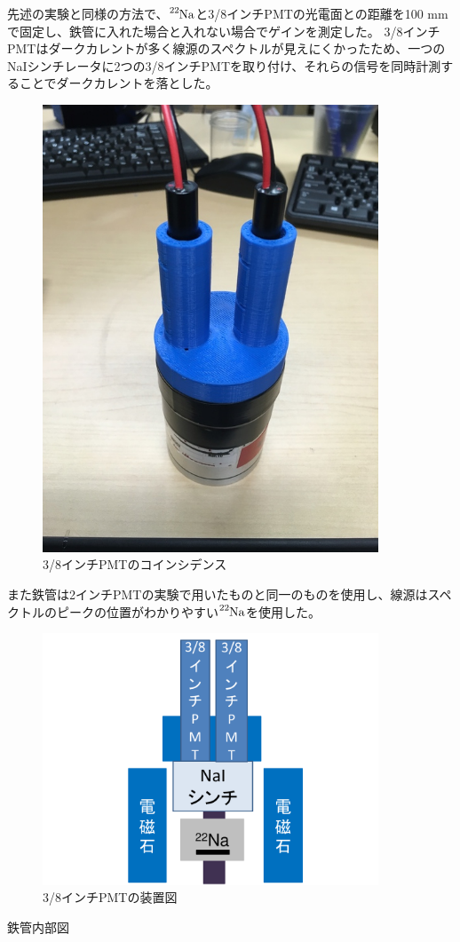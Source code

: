 先述の実験と同様の方法で、$\ce{^{22}Na}$と3/8インチPMTの光電面との距離を100 mmで固定し、鉄管に入れた場合と入れない場合でゲインを測定した。
3/8インチPMTはダークカレントが多く線源のスペクトルが見えにくかったため、一つのNaIシンチレータに2つの3/8インチPMTを取り付け、それらの信号を同時計測することでダークカレントを落とした。
\begin{figure}[H]
	\centering
		\includegraphics[width=10cm]{fig/iguchi/PPMT.jpg}
	\caption{3/8インチPMTのコインシデンス}
	\label{3/8inchcoin}
\end{figure}

また鉄管は2インチPMTの実験で用いたものと同一のものを使用し、線源はスペクトルのピークの位置がわかりやすい$\ce{^{22}Na}$を使用した。
\begin{figure}[H]
	\centering
		\includegraphics[width=10cm]{fig/iguchi/miniset.pdf}
	\caption{3/8インチPMTの装置図}
	\label{miniset}
\end{figure}
鉄管内部図

